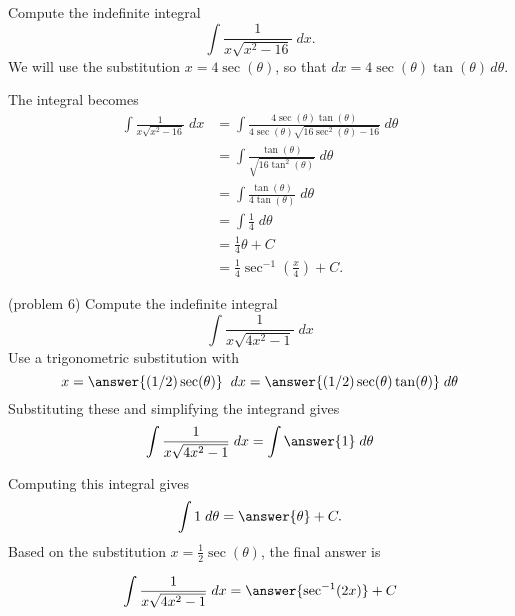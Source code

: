 \documentclass[handout]{ximera}
\begin{document}
\begin{example}[example 6]
Compute the indefinite integral
\[
\int \frac{1}{x\sqrt{x^2-16}} \; dx.
\]
We will use the substitution $x = 4\sec(\theta)$,
so that $dx = 4\sec(\theta)\tan(\theta) \, d\theta$.

The integral becomes
\begin{align*}
\int \frac{1}{x\sqrt{x^2-16}}\; dx &= \int \frac{4\sec(\theta)\tan(\theta)}{4\sec(\theta)\sqrt{16\sec^2(\theta)-16}}\; d\theta\\[6pt]
                                 &=  \int \frac{\tan(\theta)}{\sqrt{16\tan^2(\theta)}}\; d\theta\\[6pt]
                                 &=  \int \frac{\tan(\theta)}{4\tan(\theta)}\; d\theta\\[6pt]
                                  &=  \int \frac14 \; d\theta\\[6pt]
                                  &= \frac14 \theta + C\\[6pt]
                                  &= \frac14 \sec^{-1}\left(\frac{x}{4}\right)+C.
\end{align*}

\end{example}



\begin{problem}(problem 6)
Compute the indefinite integral
\[
\int \frac{1}{x\sqrt{4x^2 - 1}}\; dx
\]
Use a trigonometric substitution with\\
\[
x = \answer{(1/2)\sec(\theta)} \;\; dx = \answer{(1/2)\sec(\theta)\tan(\theta)} \; d\theta
\]
Substituting these and simplifying the integrand gives\\
\[
\int  \frac{1}{x\sqrt{4x^2-1}} \; dx = \int \answer{1} \; d\theta
\]



Computing this integral gives
\[
\int 1 \; d\theta = \answer{\theta } + C.
\]
Based on the substitution $x = \frac12\sec(\theta)$, the final answer is

\[
\int   \frac{1}{x\sqrt{4x^2 - 1}}\; dx = \answer{\sec^{-1}(2x)} + C
\]


\end{problem}
\end{document}
